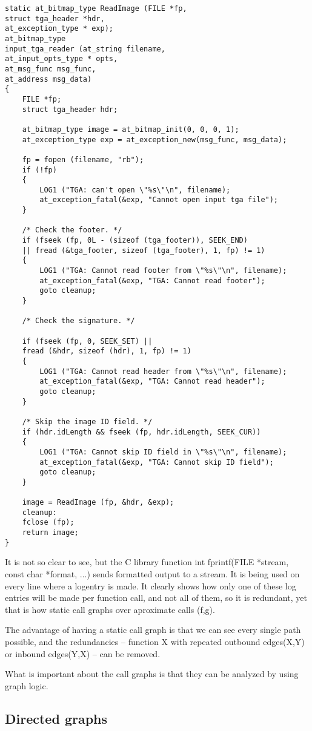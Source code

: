 \begin{lstlisting}
static at_bitmap_type ReadImage (FILE *fp,
struct tga_header *hdr,
at_exception_type * exp);
at_bitmap_type
input_tga_reader (at_string filename,
at_input_opts_type * opts,
at_msg_func msg_func, 
at_address msg_data)
{
	FILE *fp;
	struct tga_header hdr;
	
	at_bitmap_type image = at_bitmap_init(0, 0, 0, 1);
	at_exception_type exp = at_exception_new(msg_func, msg_data);
	
	fp = fopen (filename, "rb");
	if (!fp)
	{
		LOG1 ("TGA: can't open \"%s\"\n", filename);
		at_exception_fatal(&exp, "Cannot open input tga file");
	}
	
	/* Check the footer. */
	if (fseek (fp, 0L - (sizeof (tga_footer)), SEEK_END)
	|| fread (&tga_footer, sizeof (tga_footer), 1, fp) != 1)
	{
		LOG1 ("TGA: Cannot read footer from \"%s\"\n", filename);
		at_exception_fatal(&exp, "TGA: Cannot read footer");
		goto cleanup;
	}
	
	/* Check the signature. */
	
	if (fseek (fp, 0, SEEK_SET) ||
	fread (&hdr, sizeof (hdr), 1, fp) != 1)
	{
		LOG1 ("TGA: Cannot read header from \"%s\"\n", filename);
		at_exception_fatal(&exp, "TGA: Cannot read header");
		goto cleanup;
	}
	
	/* Skip the image ID field. */
	if (hdr.idLength && fseek (fp, hdr.idLength, SEEK_CUR))
	{
		LOG1 ("TGA: Cannot skip ID field in \"%s\"\n", filename);
		at_exception_fatal(&exp, "TGA: Cannot skip ID field");
		goto cleanup;
	}
	
	image = ReadImage (fp, &hdr, &exp);
	cleanup:  
	fclose (fp);
	return image;
}
\end{lstlisting}

It is not so clear to see, but the C library function int fprintf(FILE *stream, const char *format, ...) sends formatted output to a stream. It is being used on every line where a logentry is made. It clearly shows how only one of these log entries will be made per function call, and not all of them, so it is redundant, yet that is how static call graphs over aproximate calls (f,g).

The advantage of having a static call graph is that we can see every single path possible, and the redundancies -- function X with repeated outbound edges(X,Y) or inbound edges(Y,X) -- can be removed.

What is important about the call graphs is that they can be analyzed by using graph logic.

\subsection{Directed graphs}

